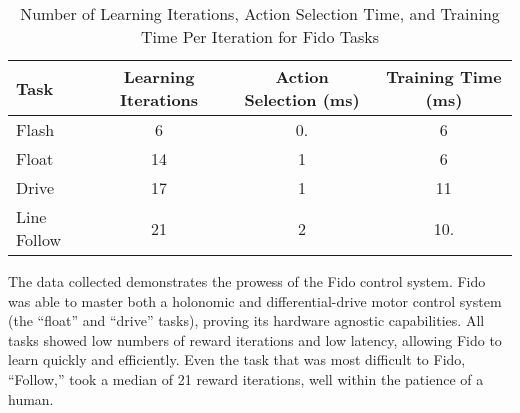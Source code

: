 \begin{table}[ht]
	\centering
	\begin{tabular}{@{}lccc@{}}
		\toprule
		Task        & Learning Iterations & Action Selection (ms) & Training Time (ms) \\ \midrule
		Flash       & 6                   & 0.                  & 6               \\
		Float       & 14                  & 1                  & 6               \\
		Drive       & 17                  & 1                  & 11              \\
		Line Follow & 21                  & 2                  & 10.               \\ \bottomrule
	\end{tabular}
	\caption{Number of Learning Iterations, Action Selection Time, and Training Time Per Iteration for Fido Tasks}
	\label{tab:data}
\end{table}

The data collected demonstrates the prowess of the Fido control system.   Fido was able to master both a holonomic and differential-drive motor control system (the ``float'' and ``drive'' tasks), proving its hardware agnostic capabilities.  All tasks showed low numbers of reward iterations and low latency, allowing Fido to learn quickly and efficiently. Even the task that was most difficult to Fido, ``Follow,'' took a median of 21 reward iterations, well within the patience of a human.

